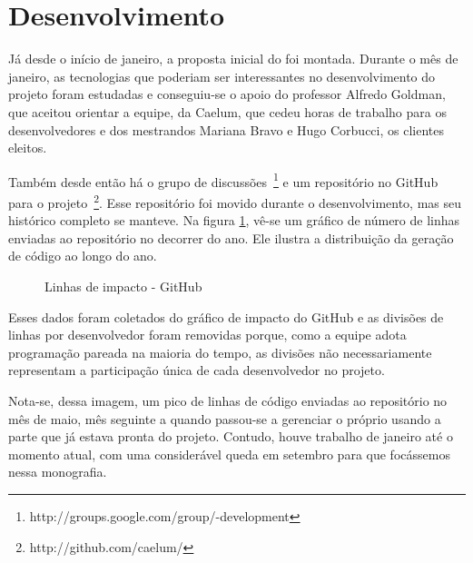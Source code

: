 \section{Desenvolvimento}

Já desde o início de janeiro, a proposta inicial do \calopsita{} foi montada. Durante o mês de janeiro, as tecnologias que poderiam ser interessantes no desenvolvimento do projeto foram estudadas e conseguiu-se o apoio do professor Alfredo Goldman, que aceitou orientar a equipe, da Caelum, que cedeu horas de trabalho para os desenvolvedores e dos mestrandos Mariana Bravo e Hugo Corbucci, os clientes eleitos.

Também desde então há o grupo de discussões~\footnote{http://groups.google.com/group/\calopsita-development} e um repositório no GitHub para o projeto~\footnote{http://github.com/caelum/\calopsita}. Esse repositório foi movido durante o desenvolvimento, mas seu histórico completo se manteve. Na figura \ref{figura:github}, vê-se um gráfico de número de linhas enviadas ao repositório no decorrer do ano. Ele ilustra a distribuição da geração de código ao longo do ano.

\begin{figure}[H]
  \centering
  \caption{Linhas de impacto - GitHub}\label{figura:github}
\end{figure}

Esses dados foram coletados do gráfico de impacto do GitHub e as divisões de linhas por desenvolvedor foram removidas porque, como a equipe adota programação pareada na maioria do tempo, as divisões não necessariamente representam a participação única de cada desenvolvedor no projeto.

Nota-se, dessa imagem, um pico de linhas de código enviadas ao repositório no mês de maio, mês seguinte a quando passou-se a gerenciar o próprio \calopsita{} usando a parte que já estava pronta do projeto. Contudo, houve trabalho de janeiro até o momento atual, com uma considerável queda em setembro para que focássemos nessa monografia.

